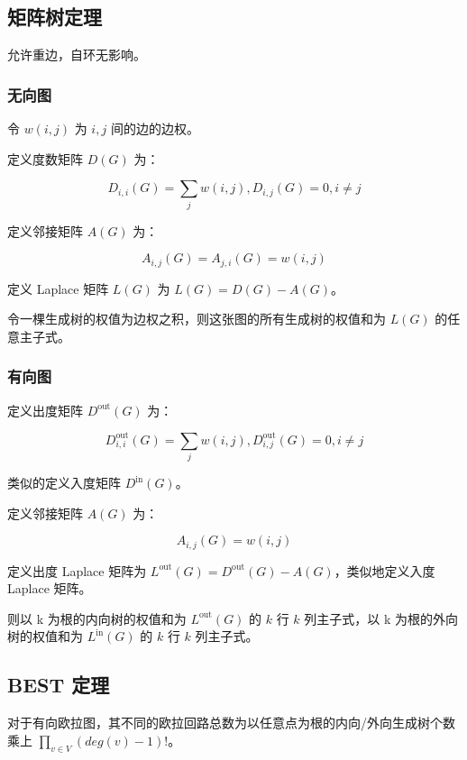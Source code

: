 \subsection{矩阵树定理}

允许重边，自环无影响。

\subsubsection{无向图}

令 $w(i, j)$ 为 $i, j$ 间的边的边权。

定义度数矩阵 $D(G)$ 为：

$$
D_{i, i}(G) = \sum\limits_{j} w(i, j), D_{i, j}(G) = 0, i \ne j
$$

定义邻接矩阵 $A(G)$ 为：

$$
A_{i, j}(G) = A_{j, i}(G) = w(i, j)
$$

定义 Laplace 矩阵 $L(G)$ 为 $L(G) = D(G) - A(G)$。

令一棵生成树的权值为边权之积，则这张图的所有生成树的权值和为 $L(G)$ 的任意主子式。

\subsubsection{有向图}

定义出度矩阵 $D^{\text{out}}(G)$ 为：

$$
D^{\text{out}}_{i, i}(G) = \sum\limits_{j} w(i, j), D^{\text{out}}_{i, j}(G) = 0, i \ne j
$$

类似的定义入度矩阵 $D^{\text{in}}(G)$。

定义邻接矩阵 $A(G)$ 为：

$$
A_{i, j}(G) = w(i, j)
$$

定义出度 Laplace 矩阵为 $L^{\text{out}}(G) = D^{\text{out}}(G) - A(G)$，类似地定义入度 Laplace 矩阵。

则以 k 为根的内向树的权值和为 $L^{\text{out}}(G)$ 的 $k$ 行 $k$ 列主子式，以 k 为根的外向树的权值和为 $L^{\text{in}}(G)$ 的 $k$ 行 $k$ 列主子式。

\subsection{BEST 定理}

对于有向欧拉图，其不同的欧拉回路总数为以任意点为根的内向/外向生成树个数乘上 $\prod_{v \in V} (deg(v) - 1)!$。